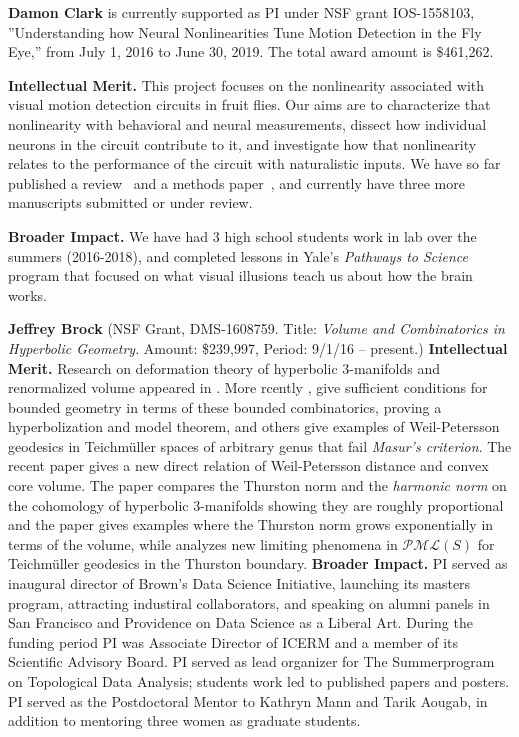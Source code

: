\vskip10pt \textbf{Damon Clark} is currently supported as PI under NSF
grant IOS-1558103, ''Understanding how Neural Nonlinearities Tune
Motion Detection in the Fly Eye,'' from July 1, 2016 to June 30, 2019.
The total award amount is \$461,262.

{\bf Intellectual Merit.} This project focuses on the nonlinearity
associated with visual motion detection circuits in fruit flies. Our
aims are to characterize that nonlinearity with behavioral and neural
measurements, dissect how individual neurons in the circuit contribute
to it, and investigate how that nonlinearity relates to the
performance of the circuit with naturalistic inputs. We have so far
published a review~\citep{clark:16} and a methods
paper~\citep{mano:17}, and currently have three more manuscripts
submitted or under review.

{\bf Broader Impact.} We have had 3 high school students work in lab
over the summers (2016-2018), and completed lessons in Yale's
\textit{Pathways to Science} program that focused on what visual
illusions teach us about how the brain works.


\textbf{Jeffrey Brock} (NSF Grant, DMS-1608759. Title: {\em Volume and Combinatorics in Hyperbolic Geometry}. Amount: \$239,997, Period: 9/1/16 --
present.)  \textbf{Intellectual Merit.} 
Research on deformation theory of hyperbolic 3-manifolds and renormalized volume appeared in \cite{}.  
More rcently \cite{BMNS:bounded:models,Brock:Modami:nue,Brock:Bromberg:vol,Brock:Bromberg:cone:inflex}, give sufficient conditions for bounded geometry in terms of these bounded combinatorics, proving a hyperbolization and model theorem, and others give examples of Weil-Petersson geodesics in Teichm\"uller spaces of arbitrary genus that fail {\em Masur's criterion}. The recent paper
  \cite{Brock:Bromberg:vol} gives a new direct relation of Weil-Petersson distance and convex core volume.
The paper \cite{Brock:Dunfield:norms} compares the Thurston norm and the {\em harmonic norm} on the cohomology of   hyperbolic 3-manifolds showing they are roughly proportional and  the paper gives examples where the Thurston norm grows exponentially in  terms of the volume, while \cite{BLMR:teichmuller} analyzes new limiting phenomena in $\mathcal{PML}(S)$ for Teichm\"uller geodesics in the Thurston boundary. 
\textbf{Broader Impact.} PI served as inaugural director of Brown's Data Science Initiative, launching its masters program, attracting industiral collaborators, and speaking on alumni panels in San Francisco and Providence on Data Science as a Liberal Art. During the funding period PI was Associate Director of ICERM and a member of its Scientific Advisory Board. PI served as lead organizer for The Summer\@ICERM program on Topological Data Analysis; students work led to published papers and posters.
PI served as the Postdoctoral Mentor to Kathryn Mann and Tarik Aougab, in addition to mentoring three women as graduate students. 